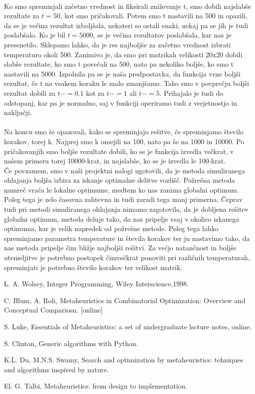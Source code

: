 \documentclass[12pt,a4paper]{amsart}
\theoremstyle{definition} %
\theoremstyle{plain} %
\begin{document}
\\
Ko smo spreminjali začetno vrednost in fiksirali zniževanje t, smo dobili najslabše rezultate za $t=50$, kot smo pričakovali. Potem smo t nastavili na 500 in opazili, da se je večina rezultat izboljšala, nekateri so ostali enaki, nekaj pa se jih je tudi poslabšalo. Ko je bil $t=5000$, se je večina rezultatov poslabšala, kar nas je presenetilo. Sklepamo lahko, da je res najboljše za začetno vrednost izbrati temperaturo okoli 500. Zanimivo je, da smo pri matrikah velikosti 20x20 dobili slabše rezultate, ko smo t povečali na 500, nato pa nekoliko boljše, ko smo t nastavili na 5000. Izpolnila pa se je naša predpostavka, da funkcija vrne boljši rezultat, če t na vsakem koraku le malo zmanjšamo. Tako smo v povprečju boljši rezultat dobili za $t -=0.1$ kot za $t -=1$ ali $t -=5$. Prihajalo je tudi do odstopanj, kar pa je normalno, saj v funkciji operiramo tudi z verjetnostjo in naključji. \\
\\
Na koncu smo še opazovali, kako se spreminjajo rešitve, če spreminjamo število korakov, torej k. Najprej smo k omejili na 100, nato pa še na 1000 in 10000. Po pričakovanjih smo boljše rezultate dobili, ko se je funkcija izvedla večkrat, v našem primeru torej 10000-krat, in najslabše, ko se je izvedla le 100-krat.\\
Če povzamem, smo v naši projektni nalogi ugotovili, da je metoda simuliranega ohlajanja boljša izbira za iskanje optimalne delitve vozlišč. Požrešna metoda namreč vrača le lokalne optimume, medtem ko nas zanima globalni optimum. Poleg tega je zelo časovna zahtevna in tudi zaradi tega manj primerna. Čeprav tudi pri metodi simuliranega ohlajanja nimamo zagotovila, da je dobljena rešitev globalni optimum, metoda deluje tako, da nas pripelje vsaj v okolico iskanega optimuma, kar je velik napredek od požrešne metode. Poleg tega lahko spreminjamo parametra temperature in števila korakov ter ju nastavimo tako, da nas metoda pripelje čim bližje najboljši rešitvi. Za večjo natančnost in boljše utemeljitve je potrebno postopek čimvečkrat ponoviti pri različnih temperaturah, spreminjati je potrebno število korakov ter velikost matrik. 

\newpage

\begin{thebibliography}{9}
L. A. Wolsey, Integer Programming, Wiley Interscience,1998. 

 
C. Blum, A. Roli, Metaheuristics in Combinatorial Optimization: Overview and Conceptual Compariosn. [online]
 
S. Luke, Essentials of Metaheuristics: a set of undergraduate lscture notes, online. 

S. Clinton, Generic algorithms with Python.

K.L. Du, M.N.S. Swamy, Search and optimization by metaheuristics: tehniques and algorithms inspired by nature. 


El. G. Talbi, Metaheuristics: from design to implementation.

\end{thebibliography}
\end{document}
